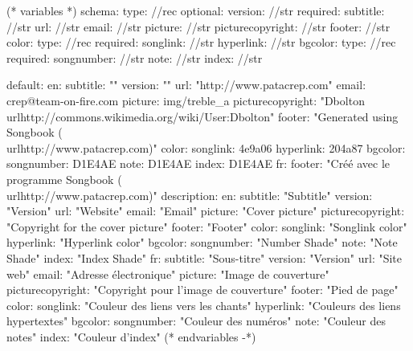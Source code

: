 
(* variables *)
schema:
  type: //rec
  optional:
    version: //str
  required:
    subtitle: //str
    url: //str
    email: //str
    picture: //str
    picturecopyright: //str
    footer: //str
    color:
      type: //rec
      required:
        songlink: //str
        hyperlink: //str
    bgcolor:
      type: //rec
      required:
        songnumber: //str
        note: //str
        index: //str

default:
  en:
    subtitle: ""
    version: ""
    url: "http://www.patacrep.com"
    email: crep@team-on-fire.com
    picture: img/treble_a
    picturecopyright: "Dbolton \\url{http://commons.wikimedia.org/wiki/User:Dbolton}"
    footer: "Generated using Songbook (\\url{http://www.patacrep.com})"
    color:
      songlink: 4e9a06
      hyperlink: 204a87
    bgcolor:
      songnumber: D1E4AE
      note: D1E4AE
      index: D1E4AE
  fr:
    footer: "Créé avec le programme Songbook (\\url{http://www.patacrep.com})"
description:
  en:
    subtitle: "Subtitle"
    version: "Version"
    url: "Website"
    email: "Email"
    picture: "Cover picture"
    picturecopyright: "Copyright for the cover picture"
    footer: "Footer"
    color:
      songlink: "Songlink color"
      hyperlink: "Hyperlink color"
    bgcolor:
      songnumber: "Number Shade"
      note: "Note Shade"
      index: "Index Shade"
  fr:
    subtitle: "Sous-titre"
    version: "Version"
    url: "Site web"
    email: "Adresse électronique"
    picture: "Image de couverture"
    picturecopyright: "Copyright pour l'image de couverture"
    footer: "Pied de page"
    color:
      songlink: "Couleur des liens vers les chants"
      hyperlink: "Couleurs des liens hypertextes"
    bgcolor:
      songnumber: "Couleur des numéros"
      note: "Couleur des notes"
      index: "Couleur d'index"
(* endvariables -*)

